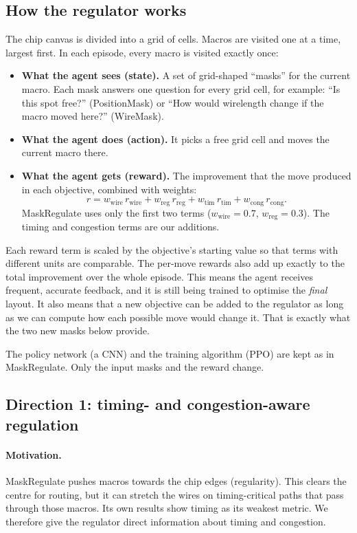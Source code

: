 \documentclass{article}
\begin{document}
\subsection{How the regulator works}
\label{sec:mdp}
The chip canvas is divided into a grid of cells. Macros are visited one at a time, largest first. In each
episode, every macro is visited exactly once:
\begin{itemize}
  \item \textbf{What the agent sees (state).} A set of grid-shaped ``masks'' for the current macro. Each
  mask answers one question for every grid cell, for example: ``Is this spot free?'' (PositionMask) or
  ``How would wirelength change if the macro moved here?'' (WireMask).
  \item \textbf{What the agent does (action).} It picks a free grid cell and moves the current macro
  there.
  \item \textbf{What the agent gets (reward).} The improvement that the move produced in each objective,
  combined with weights:
  \begin{equation}
  r=w_{\mathrm{wire}}\,r_{\mathrm{wire}}+w_{\mathrm{reg}}\,r_{\mathrm{reg}}+w_{\mathrm{tim}}\,r_{\mathrm{tim}}+w_{\mathrm{cong}}\,r_{\mathrm{cong}}.
  \label{eq:reward}
  \end{equation}
  MaskRegulate uses only the first two terms ($w_{\mathrm{wire}}=0.7$, $w_{\mathrm{reg}}=0.3$). The
  timing and congestion terms are our additions.
\end{itemize}

Each reward term is scaled by the objective's starting value so that terms with different units are
comparable. The per-move rewards also add up exactly to the total improvement over the whole episode.
This means the agent receives frequent, accurate feedback, and it is still being trained to optimise
the \emph{final} layout. It also means that a new objective can be added to the regulator as long as we
can compute how each possible move would change it. That is exactly what the two new masks below
provide.

The policy network (a CNN) and the training algorithm (PPO) are kept as in MaskRegulate. Only the input
masks and the reward change.

\subsection{Direction 1: timing- and congestion-aware regulation}
\label{sec:d1}

\paragraph{Motivation.} MaskRegulate pushes macros towards the chip edges (regularity). This clears the
centre for routing, but it can stretch the wires on timing-critical paths that pass through those
macros. Its own results show timing as its weakest metric. We therefore give the regulator direct
information about timing and congestion.
\end{document}
